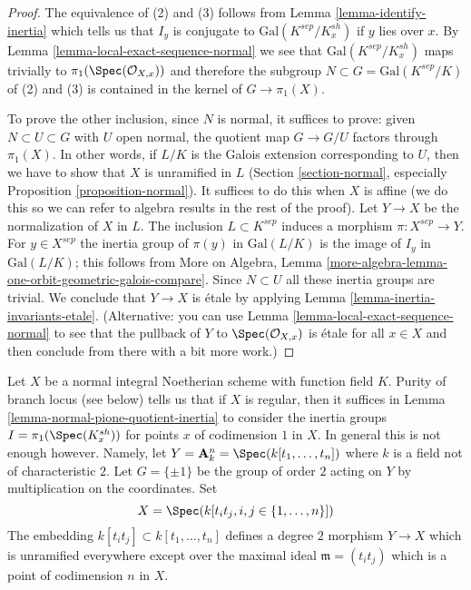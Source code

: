 \begin{proof}
The equivalence of (2) and (3) follows from
Lemma \ref{lemma-identify-inertia}
which tells us that $I_y$ is conjugate to $\text{Gal}(K^{sep}/K_x^{sh})$
if $y$ lies over $x$. By Lemma \ref{lemma-local-exact-sequence-normal}
we see that $\text{Gal}(K^{sep}/K_x^{sh})$ maps trivially to
$\pi_1(\Spec(\mathcal{O}_{X, x}))$ and therefore the subgroup
$N \subset G = \text{Gal}(K^{sep}/K)$
of (2) and (3) is contained in the kernel of
$G \longrightarrow \pi_1(X)$.

\medskip\noindent
To prove the other inclusion, since $N$ is normal, it suffices to prove:
given $N \subset U \subset G$ with $U$ open normal,
the quotient map $G \to G/U$ factors through $\pi_1(X)$.
In other words, if $L/K$ is the Galois extension corresponding
to $U$, then we have to show that $X$ is unramified in $L$
(Section \ref{section-normal}, especially
Proposition \ref{proposition-normal}).
It suffices to do this when $X$ is affine (we do this
so we can refer to algebra results in the rest of the proof).
Let $Y \to X$ be the normalization of $X$ in $L$.
The inclusion $L \subset K^{sep}$ induces a morphism
$\pi : X^{sep} \to Y$. For $y \in X^{sep}$
the inertia group of $\pi(y)$ in $\text{Gal}(L/K)$
is the image of $I_y$ in $\text{Gal}(L/K)$; this follows
from More on Algebra, Lemma
\ref{more-algebra-lemma-one-orbit-geometric-galois-compare}.
Since $N \subset U$ all these inertia groups are trivial.
We conclude that $Y \to X$ is \'etale by applying
Lemma \ref{lemma-inertia-invariants-etale}.
(Alternative: you can use Lemma \ref{lemma-local-exact-sequence-normal}
to see that the pullback of $Y$ to $\Spec(\mathcal{O}_{X, x})$ is
\'etale for all $x \in X$ and then conclude from there
with a bit more work.)
\end{proof}

\begin{example}
\label{example-bigger-codim}
Let $X$ be a normal integral Noetherian scheme with function field $K$.
Purity of branch locus (see below) tells us that if $X$ is regular, then
it suffices in Lemma \ref{lemma-normal-pione-quotient-inertia}
to consider the inertia groups $I = \pi_1(\Spec(K_x^{sh}))$
for points $x$ of codimension $1$ in $X$.
In general this is not enough however. Namely, let
$Y = \mathbf{A}_k^n = \Spec(k[t_1, \ldots, t_n])$
where $k$ is a field not of characteristic $2$.
Let $G = \{\pm 1\}$ be the group of order $2$ acting on $Y$
by multiplication on the coordinates. Set
$$
X = \Spec(k[t_it_j, i, j \in \{1, \ldots, n\}])
$$
The embedding $k[t_it_j] \subset k[t_1, \ldots, t_n]$
defines a degree $2$ morphism $Y \to X$ which is unramified everywhere
except over the maximal ideal $\mathfrak m = (t_it_j)$
which is a point of codimension $n$ in $X$.
\end{example}


